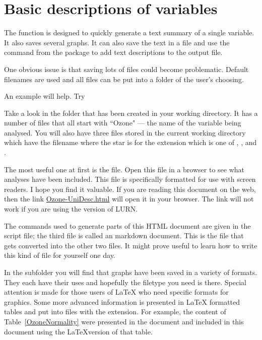 \section{Basic descriptions of variables}

The  function is designed to quickly generate a text summary of a single variable. It also saves several graphs. It can also save the text in a file and use the  command from the  package to add text descriptions to the output file.

One obvious issue is that saving lots of files could become problematic. Default filenames are used and all files can be put into a folder of the user's choosing.

An example will help. Try
\begin{Schunk}
\end{Schunk}
Take a look in the  folder that has been created in your working directory. It has a number of files that all start with ``Ozone" --- the name of the variable being analysed.  You will also have three files stored in the current working directory which have the filename  where the star is for the extension which is one of , , and .

The most useful one at first is the  file. Open this file in a browser to see what analyses have been included. This file is specifically formatted for use with screen readers. I hope you find it valuable. If you are reading this document on the web, then the link \url{Ozone-UniDesc.html} will open it in your browser. The link will not work if you are using the  version of LURN.

The commands used to generate parts of this HTML document are given in the \R{} script file; the third file is called an \R{} markdown document. This is the file that gets converted into the other two files. It might prove useful to learn how to write this kind of file for yourself one day.

In the  subfolder you will find that graphs have been saved in a variety of formats. They each have their uses and hopefully the filetype you need is there. Special attention is made for those users of \LaTeX{} who need specific formats for graphics. Some more advanced information is presented in \LaTeX{} formatted tables and put into files with the  extension. For example, the content of Table~\ref{OzoneNormality} were presented in the  document and included in this document using the \LaTeX{}version of that table.



